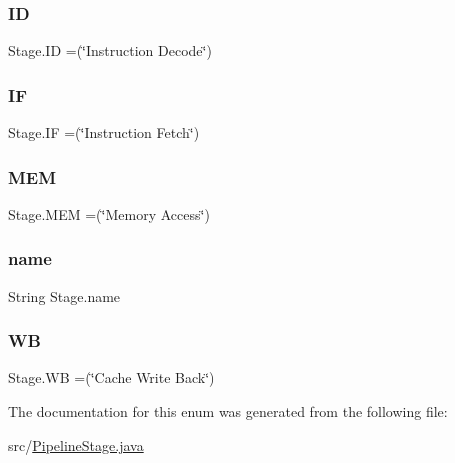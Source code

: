 \subsubsection{\texorpdfstring{ID}{ID}}
{\footnotesize\ttfamily Stage.\+ID =(\char`\"{}Instruction Decode\char`\"{})}

\mbox{\label{enum_stage_aeffba6edad8f19fb7f9a4d8acf9c5a7b}} 
\subsubsection{\texorpdfstring{IF}{IF}}
{\footnotesize\ttfamily Stage.\+IF =(\char`\"{}Instruction Fetch\char`\"{})}

\mbox{\label{enum_stage_a9f5ca32ff09a37d81d80d1298350a57d}} 
\subsubsection{\texorpdfstring{M\+EM}{MEM}}
{\footnotesize\ttfamily Stage.\+M\+EM =(\char`\"{}Memory Access\char`\"{})}

\mbox{\label{enum_stage_af32f9e7d7f90f13fd25b01dccbc49cb0}} 
\subsubsection{\texorpdfstring{name}{name}}
{\footnotesize\ttfamily String Stage.\+name\hspace{0.3cm}{\ttfamily [private]}}

\mbox{\label{enum_stage_af6726871c185b151ca9747f844e71b9c}} 
\subsubsection{\texorpdfstring{WB}{WB}}
{\footnotesize\ttfamily Stage.\+WB =(\char`\"{}Cache Write Back\char`\"{})}



The documentation for this enum was generated from the following file\+:\begin{DoxyCompactItemize}
\item 
src/\mbox{\hyperlink{_pipeline_stage_8java}{Pipeline\+Stage.\+java}}\end{DoxyCompactItemize}
